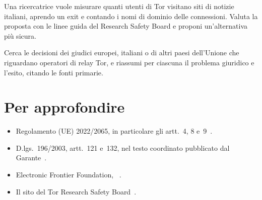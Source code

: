 \begin{esercizio}[2]\label{es:25-esperimento}
Una ricercatrice vuole misurare quanti utenti di Tor visitano siti di notizie italiani, aprendo un exit e contando i nomi di dominio delle connessioni. Valuta la proposta con le linee guida del Research Safety Board e proponi un'alternativa più sicura.
\end{esercizio}

\begin{esercizio}[3]\label{es:25-ricerca}
Cerca le decisioni dei giudici europei, italiani o di altri paesi dell'Unione che riguardano operatori di relay Tor, e riassumi per ciascuna il problema giuridico e l'esito, citando le fonti primarie.
\end{esercizio}

\section*{Per approfondire}
\begin{itemize}
  \item Regolamento (UE) 2022/2065, in particolare gli artt.~4, 8 e~9~\cite{dsa2022}.
  \item D.lgs.\ 196/2003, artt.~121 e~132, nel testo coordinato pubblicato dal Garante~\cite{codiceprivacy}.
  \item Electronic Frontier Foundation, ~\cite{efflegalfaq}.
  \item Il sito del Tor Research Safety Board~\cite{trsb}.
\end{itemize}
